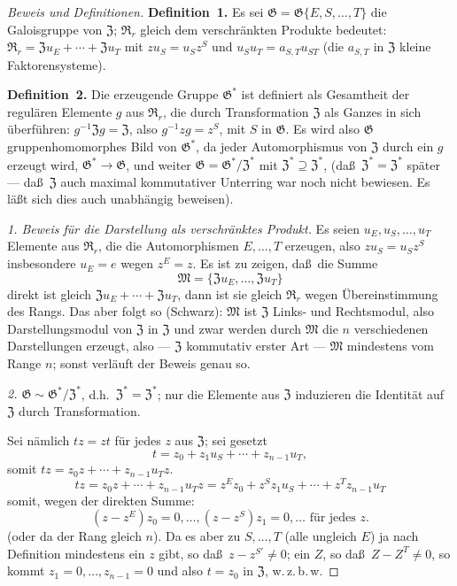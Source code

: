 \documentclass[12pt,a4paper]{article}
\theoremstyle{plain}
\theoremstyle{definition}
\theoremstyle{remark}
\newcommand{\wzbw}{w.\,z.\,b.\,w.}
\begin{document}
\begin{proof}[Beweis und Definitionen]
\textbf{Definition~1.} Es sei $\mathfrak{G} = \mathfrak{G}\{E, S, \ldots, T\}$ die Galoisgruppe
von $\mathfrak{Z}$; $\mathfrak{R}_{r}$ gleich dem verschr\"ankten Produkte bedeutet:
$\mathfrak{R}_{r} = \mathfrak{Z}u_{E} + \cdots + \mathfrak{Z}u_{T}$ mit $zu_{S} = u_{S}z^{S}$ und
$u_{S}u_{T} = a_{S,T}u_{ST}$ (die $a_{S,T}$ in $\mathfrak{Z}$ kleine Faktorensysteme).

\textbf{Definition~2.} Die erzeugende Gruppe $\mathfrak{G}^{*}$ ist definiert als
Gesamtheit der regul\"aren Elemente $g$ aus $\mathfrak{R}_{r}$, die durch
Transformation $\mathfrak{Z}$ als Ganzes in sich \"uberf\"uhren:
$g^{-1}\mathfrak{Z}g = \mathfrak{Z}$, also $g^{-1}zg = z^{S}$, mit $S$ in $\mathfrak{G}$. Es wird
also $\mathfrak{G}$ gruppenhomomorphes Bild von $\mathfrak{G}^{*}$, da jeder
Automorphismus von $\mathfrak{Z}$ durch ein $g$ erzeugt wird,
$\mathfrak{G}^{*} \to \mathfrak{G}$, und weiter $\mathfrak{G} = \mathfrak{G}^{*}/\mathfrak{Z}^{*}$ mit
$\mathfrak{Z}^{*} \supseteq \mathfrak{Z}^{*}$, (da\ss\ $\mathfrak{Z}^{*} = \mathfrak{Z}^{*}$ sp\"ater --- da\ss\ $\mathfrak{Z}$ auch maximal kommutativer Unterring war noch nicht bewiesen.
Es l\"a\ss t sich dies auch unabh\"angig beweisen).

\textit{1. Beweis f\"ur die Darstellung als verschr\"anktes Produkt.} Es seien
$u_{E}, u_{S}, \ldots, u_{T}$ Elemente aus $\mathfrak{R}_{r}$, die die Automorphismen
$E, \ldots, T$ erzeugen, also $zu_{S} = u_{S}z^{S}$ insbesondere $u_{E} = e$
wegen $z^{E} = z$. Es ist zu zeigen, da\ss\ die Summe
\[
\mathfrak{M} = \{\mathfrak{Z}u_{E}, \ldots, \mathfrak{Z}u_{T}\}
\]
direkt ist gleich $\mathfrak{Z}u_{E} + \cdots + \mathfrak{Z}u_{T}$, dann ist sie gleich
$\mathfrak{R}_{r}$ wegen \"Ubereinstimmung des Rangs. Das aber folgt so (Schwarz):
$\mathfrak{M}$ ist $\mathfrak{Z}$ Links- und Rechtsmodul, also Darstellungsmodul von
$\mathfrak{Z}$ in $\mathfrak{Z}$ und zwar werden durch $\mathfrak{M}$ die $n$ verschiedenen
Darstellungen erzeugt, also --- $\mathfrak{Z}$ kommutativ erster Art --- $\mathfrak{M}$
mindestens vom Range $n$; sonst verl\"auft der Beweis genau so.

\textit{2. $\mathfrak{G} \sim \mathfrak{G}^{*}/\mathfrak{Z}^{*}$}, d.h.\ $\mathfrak{Z}^{*} = \mathfrak{Z}^{*}$; nur die Elemente aus $\mathfrak{Z}$
induzieren die Identit\"at auf $\mathfrak{Z}$ durch Transformation.

Sei n\"amlich $tz = zt$ f\"ur jedes $z$ aus $\mathfrak{Z}$; sei gesetzt
\[
t = z_{0} + z_{1}u_{S} + \cdots + z_{n-1}u_{T},
\]
somit $tz = z_{0}z + \cdots + z_{n-1}u_{T}z$.
\[
tz = z_{0}z + \cdots + z_{n-1}u_{T}z = z^{E}z_{0} + z^{S}z_{1}u_{S} + \cdots + z^{T}z_{n-1}u_{T}
\]
somit, wegen der direkten Summe:
\[
(z - z^{E})z_{0} = 0, \ldots, (z - z^{S})z_{1} = 0, \ldots \text{ f\"ur jedes } z.
\]
(oder da der Rang gleich $n$). Da es aber zu $S, \ldots, T$ (alle
ungleich $E$) ja nach Definition mindestens ein $z$ gibt, so da\ss\ $z - z^{S'} \neq 0$; ein $Z$, so da\ss\ $Z - Z^{T} \neq 0$, so kommt
$z_{1} = 0, \ldots, z_{n-1} = 0$ und also $t = z_{0}$ in $\mathfrak{Z}$, \wzbw


\end{proof}
\end{document}
